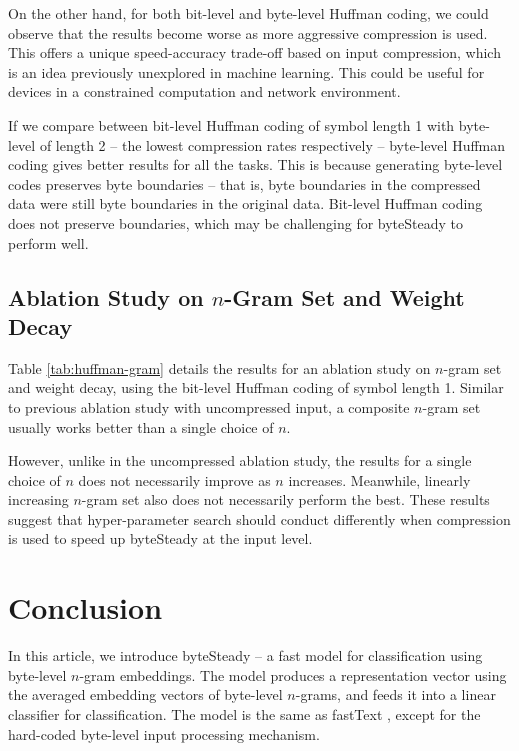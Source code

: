 \documentclass[sigconf,review, anonymous]{acmart}
\begin{document}
On the other hand, for both bit-level and byte-level Huffman coding, we could observe that the results become worse as more aggressive compression is used. This offers a unique speed-accuracy trade-off based on input compression, which is an idea previously unexplored in machine learning. This could be useful for devices in a constrained computation and network environment.

If we compare between bit-level Huffman coding of symbol length 1 with byte-level of length 2 -- the lowest compression rates respectively -- byte-level Huffman coding gives better results for all the tasks. This is because generating byte-level codes preserves byte boundaries -- that is, byte boundaries in the compressed data were still byte boundaries in the original data. Bit-level Huffman coding does not preserve boundaries, which may be challenging for byteSteady to perform well.

\subsection{Ablation Study on \(n\)-Gram Set and Weight Decay}

Table \ref{tab:huffman-gram} details the results for an ablation study on \(n\)-gram set and weight decay, using the bit-level Huffman coding of symbol length 1. Similar to previous ablation study with uncompressed input, a composite \(n\)-gram set usually works better than a single choice of \(n\).

However, unlike in the uncompressed ablation study, the results for a single choice of \(n\) does not necessarily improve as \(n\) increases. Meanwhile, linearly increasing \(n\)-gram set also does not necessarily perform the best. These results suggest that hyper-parameter search should conduct differently when compression is used to speed up byteSteady at the input level.

\section{Conclusion}

In this article, we introduce byteSteady -- a fast model for classification using byte-level \(n\)-gram embeddings. The model produces a representation vector using the averaged embedding vectors of byte-level \(n\)-grams, and feeds it into a linear classifier for classification. The model is the same as fastText \cite{JGBM16}, except for the hard-coded byte-level input processing mechanism.
\end{document}
